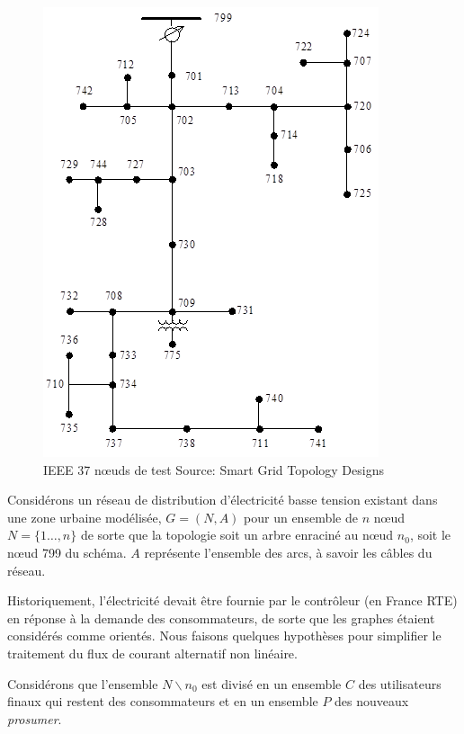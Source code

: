 \begin{figure}
  \includegraphics[scale=0.5]{media/ieee_radial_tree.png}
  \caption{
      IEEE 37 nœuds de test\newline
      \tiny{Source:\newline
        Smart Grid Topology Designs
      }
  }
  \label{fig:ieee_radial_tree}
\end{figure}

Considérons un réseau de distribution d'électricité basse tension existant dans une zone urbaine modélisée,
$G = (N, A)$ pour un ensemble de $n$ nœud $N = \lbrace 1 \dots, n \rbrace$ de sorte que la topologie soit un arbre enraciné
au nœud $n_0$, soit le nœud 799 du schéma. $A$ représente l'ensemble des arcs, à savoir les câbles du réseau.

Historiquement, l'électricité devait être fournie par le contrôleur (en France RTE) en réponse à la demande des consommateurs,
de sorte que les graphes étaient considérés comme orientés.
Nous faisons quelques hypothèses pour simplifier le traitement du flux de courant alternatif non linéaire.

Considérons que l'ensemble $N \backslash n_0$ est divisé en un ensemble $C$ des utilisateurs finaux qui restent des consommateurs et
en un ensemble $P$ des nouveaux \textit{prosumer}.

